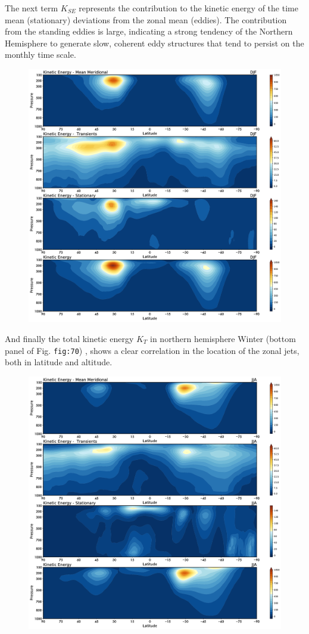 The next term \(K_{SE}\) represents the contribution to the kinetic
energy of the time mean (stationary) deviations from the zonal mean
(eddies). The contribution from the standing eddies is large, indicating
a strong tendency of the Northern Hemisphere to generate slow, coherent
eddy structures that tend to persist on the monthly time scale.

\begin{figure}
\centering
\includegraphics[width = .7 \textwidth]{figs/GD/DJFKEFlux.png}
\caption{}\label{}
\end{figure}

And finally the total kinetic energy \(K_T\) in northern hemisphere
Winter (bottom panel of Fig. \texttt{fig:70}) , shows a clear
correlation in the location of the zonal jets, both in latitude and
altitude.

\begin{figure}
\centering
\includegraphics[width = .7 \textwidth]{figs/GD/JJAKEFlux.png}
\caption{}\label{}
\end{figure}

